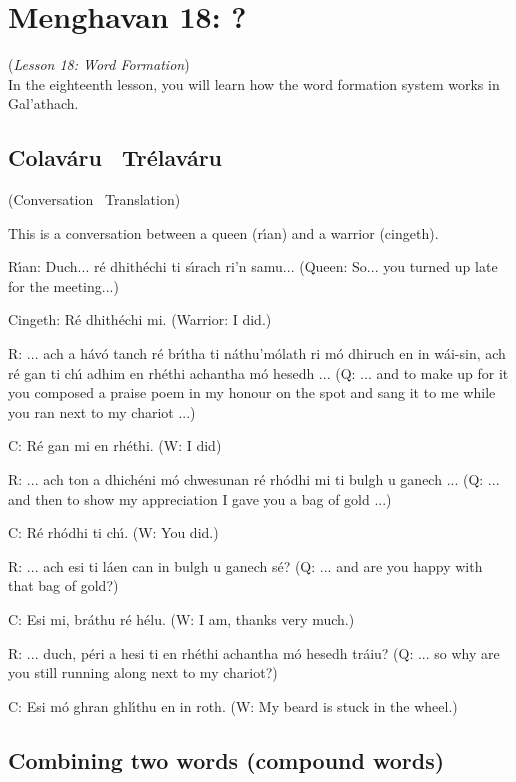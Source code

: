 \section{Menghavan 18: ?}
(\textit{Lesson 18: Word Formation})\\

In the eighteenth lesson, you will learn how the word formation system works in Gal'{a}thach.

\subsection{Colav\'{a}ru \textendash\ Tr\'{e}lav\'{a}ru}
(Conversation \textendash\ Translation)

This is a conversation between a queen (r\'{\i}an) and a warrior (cingeth).

R\'{\i}an: Duch...  r\'{e} dhith\'{e}chi ti s\'{\i}rach ri'n samu...
(Queen: So... you turned up late for the meeting...)

Cingeth: R\'{e} dhith\'{e}chi mi.
(Warrior: I did.)

R: ... ach a h\'{a}v\'{o} tanch r\'{e} br\'{\i}tha ti n\'{a}thu'm\'{o}lath ri m\'{o} dhiruch en in w\'{a}i-sin, ach r\'{e} gan ti ch\'{\i} adhim en rh\'{e}thi achantha m\'{o} hesedh ...
(Q: ... and to make up for it you composed a praise poem in my honour on the spot and sang it to me while you ran next to my chariot ...)

C: R\'{e} gan mi en rh\'{e}thi.
(W: I did)

R: ... ach ton a dhich\'{e}ni m\'{o} chwesunan r\'{e} rh\'{o}dhi mi ti bulgh u ganech ... 
(Q: ... and then to show my appreciation I gave you a bag of gold ...)

C: R\'{e} rh\'{o}dhi ti ch\'{\i}.
(W: You did.)

R: ... ach esi ti l\'{a}en can in bulgh u ganech s\'{e}?
(Q: ... and are you happy with that bag of gold?)

C: Esi mi, br\'{a}thu r\'{e} h\'{e}lu.
(W: I am, thanks very much.)

R: ... duch, p\'{e}ri a hesi ti en rh\'{e}thi achantha m\'{o} hesedh tr\'{a}iu?
(Q: ... so why are you still running along next to my chariot?)

C: Esi m\'{o} ghran ghl\'{\i}thu en in roth.
(W: My beard is stuck in the wheel.)

\subsection{Combining two words (compound words)}

